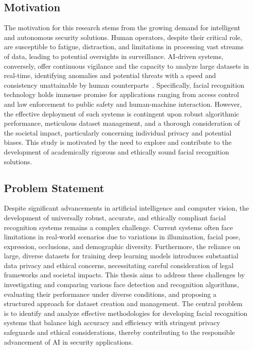 \subsection*{Motivation}
The motivation for this research stems from the growing demand for intelligent and autonomous security solutions. Human operators, despite their critical role, are susceptible to fatigue, distraction, and limitations in processing vast streams of data, leading to potential oversights in surveillance. AI-driven systems, conversely, offer continuous vigilance and the capacity to analyze large datasets in real-time, identifying anomalies and potential threats with a speed and consistency unattainable by human counterparts~\cite{securityindustry_2025_transforming}. Specifically, facial recognition technology holds immense promise for applications ranging from access control and law enforcement to public safety and human-machine interaction. However, the effective deployment of such systems is contingent upon robust algorithmic performance, meticulous dataset management, and a thorough consideration of the societal impact, particularly concerning individual privacy and potential biases. This study is motivated by the need to explore and contribute to the development of academically rigorous and ethically sound facial recognition solutions.

\subsection*{Problem Statement}
Despite significant advancements in artificial intelligence and computer vision, the development of universally robust, accurate, and ethically compliant facial recognition systems remains a complex challenge. Current systems often face limitations in real-world scenarios due to variations in illumination, facial pose, expression, occlusions, and demographic diversity. Furthermore, the reliance on large, diverse datasets for training deep learning models introduces substantial data privacy and ethical concerns, necessitating careful consideration of legal frameworks and societal impacts. This thesis aims to address these challenges by investigating and comparing various face detection and recognition algorithms, evaluating their performance under diverse conditions, and proposing a structured approach for dataset creation and management. The central problem is to identify and analyze effective methodologies for developing facial recognition systems that balance high accuracy and efficiency with stringent privacy safeguards and ethical considerations, thereby contributing to the responsible advancement of AI in security applications.
